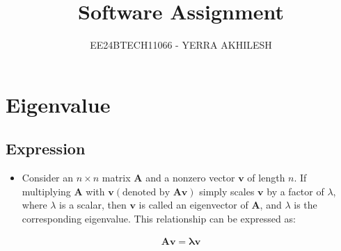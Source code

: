 \documentclass[journal]{IEEEtran}
\begin{document}

\vspace{3cm}

\title{Software Assignment}
\author{EE24BTECH11066 - YERRA AKHILESH
}
{\let\newpage\relax\maketitle}

\renewcommand{\thefigure}{\theenumi}
\renewcommand{\thetable}{\theenumi}
\setlength{\intextsep}{10pt} %

\renewcommand{\thetable}{\theenumi}

\section{Eigenvalue} %
\subsection{Expression}

\begin{itemize}
    \item Consider an $n\times n$  matrix $\mathbf{A}$ and a nonzero vector $\mathbf{v}$ of length $n$.  If multiplying $\mathbf{A}$ with $\mathbf{v}  (\text{denoted by }  \mathbf{A} \mathbf{v} )$ simply scales $\mathbf{v}$  by a factor of $\lambda$, where $\lambda$ is a scalar, then $\mathbf{v}$ is called an eigenvector of $\mathbf{A}$, and $\lambda$ is the corresponding eigenvalue. This relationship can be expressed as: 
\end{itemize}

\begin{align*}
    \mathbf{A} \mathbf{v} = \mathbf{\lambda} \mathbf{v}
\end{align*}
\end{document}
